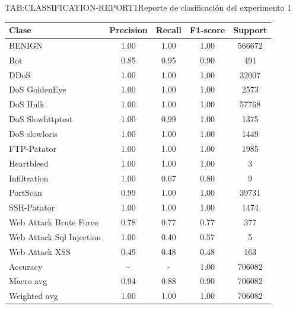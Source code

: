 \begin{table}{TAB:CLASSIFICATION-REPORT1}{Reporte de clasificación del experimento 1}
\centering
\scriptsize
\begin{tabular}{p{4.6cm}cccc}
\hline
Clase & Precision & Recall & F1-score & Support \\
\hline
BENIGN & 1.00 & 1.00 & 1.00 & 566672 \\
Bot & 0.85 & 0.95 & 0.90 & 491 \\
DDoS & 1.00 & 1.00 & 1.00 & 32007 \\
DoS GoldenEye & 1.00 & 1.00 & 1.00 & 2573 \\
DoS Hulk & 1.00 & 1.00 & 1.00 & 57768 \\
DoS Slowhttptest & 1.00 & 0.99 & 1.00 & 1375 \\
DoS slowloris & 1.00 & 1.00 & 1.00 & 1449 \\
FTP-Patator & 1.00 & 1.00 & 1.00 & 1985 \\
Heartbleed & 1.00 & 1.00 & 1.00 & 3 \\
Infiltration & 1.00 & 0.67 & 0.80 & 9 \\
PortScan & 0.99 & 1.00 & 1.00 & 39731 \\
SSH-Patator & 1.00 & 1.00 & 1.00 & 1474 \\
Web Attack Brute Force & 0.78 & 0.77 & 0.77 & 377 \\
Web Attack Sql Injection & 1.00 & 0.40 & 0.57 & 5 \\
Web Attack XSS & 0.49 & 0.48 & 0.48 & 163 \\
\hline
Accuracy & - & - & 1.00 & 706082 \\
Macro avg & 0.94 & 0.88 & 0.90 & 706082 \\
Weighted avg & 1.00 & 1.00 & 1.00 & 706082 \\
\hline
\end{tabular}
\end{table}

